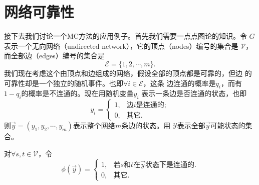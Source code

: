 \section{网络可靠性}

接下去我们讨论一个MC方法的应用例子。首先我们需要一点点图论的知识。令
$G$表示一个无向网络（undirected network），它的顶点（nodes）编号的集合是
$\mathscr{V}$，而全部边（edges）编号的集合是
$$
\mathscr{E} = \{1, 2, \cdots, m\}.
$$
我们现在考虑这个由顶点和边组成的网络，假设全部的顶点都是可靠的，但边
的可靠性却是一个独立的随机事件。也即$\forall i \in \mathscr{E}$，这条
边连通的概率是$q_i$，而有$1 - q_i$的概率是不连通的。现在用随机变量$y_i$
表示一条边是否连通的状态，也即
$$
y_i = \left\{
\begin{array}{ll}
  1, & \mbox{边$i$是连通的};\\
  0, & \mbox{其它}.
\end{array}
\right.
$$
则$\vec{y} = (y_1, y_2, \cdots, y_m)$表示整个网络$m$条边的状态。用
$\mathscr{Y}$表示全部$\vec{y}$可能状态的集合。

对$\forall s, t \in \mathscr{V}$，令
$$
\phi(\vec{y}) = \left\{
\begin{array}{ll}
  1, & \mbox{若$s$和$t$在$\vec{y}$状态下是连通的}.\\
  0, & \mbox{其它}.
\end{array}
\right.
$$

